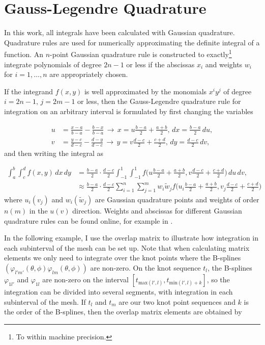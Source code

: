 \section{Gauss-Legendre Quadrature}
In this work, all integrals have been calculated with Gaussian quadrature. Quadrature rules are used for numerically approximating the definite integral of a function. An $n$-point Gaussian quadrature rule is constructed to exactly\footnote{To within machine precision.} integrate polynomials of degree $2n-1$ or less if the abscissas $x_i$ and weights $w_i$ for $i=1,\ldots,n$ are appropriately chosen. 

If the integrand $f(x,y)$ is well approximated by the monomials $x^{i}y^{j}$ of degree $i = 2n-1, \, j = 2m-1$ or less, then the Gauss-Legendre quadrature rule for integration on an arbitrary interval is formulated by first changing the variables

\begin{equation}
\begin{aligned}
u &= \frac{x-a}{b-a} - \frac{b-x}{b-a} \, \rightarrow \, x= u\frac{b-a}{2}+\frac{a+b}{2}, \,dx=\frac{b-a}{2}\,du, \\
v &= \frac{y-c}{d-c} - \frac{d-y}{d-c} \, \rightarrow \, y= v\frac{d-c}{2}+\frac{c+d}{2}, \,dy=\frac{d-c}{2}\,dv,
\end{aligned}
\end{equation} 
and then writing the integral as

\begin{equation}
\begin{aligned}
\int_{a}^{b} \int_{c}^{d}f(x,y) \,dx\,dy &= \frac{b-a}{2} \cdot \frac{d-c}{2} \int_{-1}^{1} \int_{-1}^{1}f \bigg( u\frac{b-a}{2} + \frac{a+b}{2},v\frac{d-c}{2} + \frac{c+d}{2} \bigg) \,du\,dv,\\
&\approx \frac{b-a}{2} \cdot \frac{d-c}{2} \sum_{i=1}^{n}\sum_{j=1}^{m}w_i \tilde{w}_j f\bigg( u_i\frac{b-a}{2} + \frac{a+b}{2},v_j\frac{d-c}{2} + \frac{c+d}{2}\bigg)
\end{aligned}
\end{equation}
where $u_i (v_j)$ and $w_i (\tilde{w}_j)$ are Gaussian quadrature points and weights of order $n (m)$ in the $u (v)$ direction. Weights and abscissas for different Gaussian quadrature rules can be found online, for example in \cite{NumericalRecipes}.

In the following example, I use the overlap matrix to illustrate how integration in each subinterval of the mesh can be set up. Note that when calculating matrix elements we only need to integrate over the knot points where the B-splines $(\varphi_{l'm'}(\theta,\phi)\varphi_{lm}(\theta,\phi))$ are non-zero. On the knot sequence $t_{l}$, the B-splines $\varphi_{1l'}$ and $\varphi_{1l}$ are non-zero on the interval $[t_{\text{max}(l',l)},t_{\text{min}(l',l)+k}]$, so the integration can be divided into several segments, with integration in each subinterval of the mesh. If $t_{l}$ and $t_{m}$ are our two knot point sequences and $k$ is the order of the B-splines, then the overlap matrix elements are obtained by

